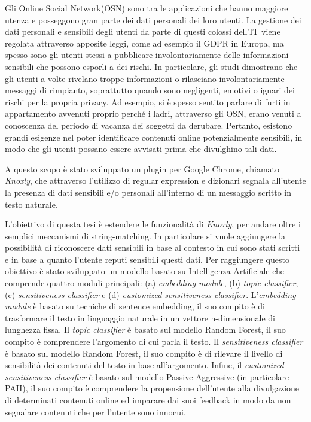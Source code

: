 Gli Online Social Network(OSN) sono tra le applicazioni che hanno maggiore utenza e posseggono gran parte dei dati personali dei loro utenti.\newline
La gestione dei dati personali e sensibili degli utenti da parte di questi colossi dell'IT viene regolata attraverso apposite leggi, come ad esempio il GDPR in Europa, ma spesso sono gli utenti stessi a pubblicare involontariamente delle informazioni sensibili che possono esporli a dei rischi. In particolare, gli studi dimostrano che gli utenti a volte rivelano troppe informazioni o rilasciano involontariamente messaggi di rimpianto, soprattutto quando sono negligenti, emotivi o ignari dei rischi per la propria privacy. Ad esempio, si è spesso sentito parlare di furti in appartamento avvenuti proprio perché i ladri, attraverso gli OSN, erano venuti a conoscenza del periodo di vacanza dei soggetti da derubare. Pertanto, esistono grandi esigenze nel poter identificare contenuti online potenzialmente sensibili, in modo che gli utenti possano essere avvisati prima che divulghino tali dati.

A questo scopo è stato sviluppato un plugin per Google Chrome, chiamato \textit{Knoxly}, che attraverso l'utilizzo di regular expression e dizionari segnala all'utente la presenza di dati sensibili e/o personali all'interno di un messaggio scritto in testo naturale.

L'obiettivo di questa tesi è estendere le funzionalità di \textit{Knoxly}, per andare oltre i semplici meccanismi di string-matching. In particolare si vuole aggiungere la possibilità di riconoscere dati sensibili in base al contesto in cui sono stati scritti e in base a quanto l'utente reputi sensibili questi dati. Per raggiungere questo obiettivo è stato sviluppato un modello basato su Intelligenza Artificiale che comprende quattro moduli principali: (a) \textit{embedding module}, (b) \textit{topic classifier}, (c) \textit{sensitiveness classifier} e (d) \textit{customized sensitiveness classifier}. L'\textit{embedding module} è basato su tecniche di sentence embedding, il suo compito è di trasformare il testo in linguaggio naturale in un vettore n-dimensionale di lunghezza fissa. Il \textit{topic classifier} è basato sul modello Random Forest, il suo compito è comprendere l'argomento di cui parla il testo. Il \textit{sensitiveness classifier} è basato sul modello Random Forest, il suo compito è di rilevare il livello di sensibilità dei contenuti del testo in base all'argomento. Infine, il \textit{customized sensitiveness classifier} è basato sul modello Passive-Aggressive (in particolare PAII), il suo compito è comprendere la propensione dell'utente alla divulgazione di determinati contenuti online ed imparare dai suoi feedback in modo da non segnalare contenuti che per l'utente sono innocui. 